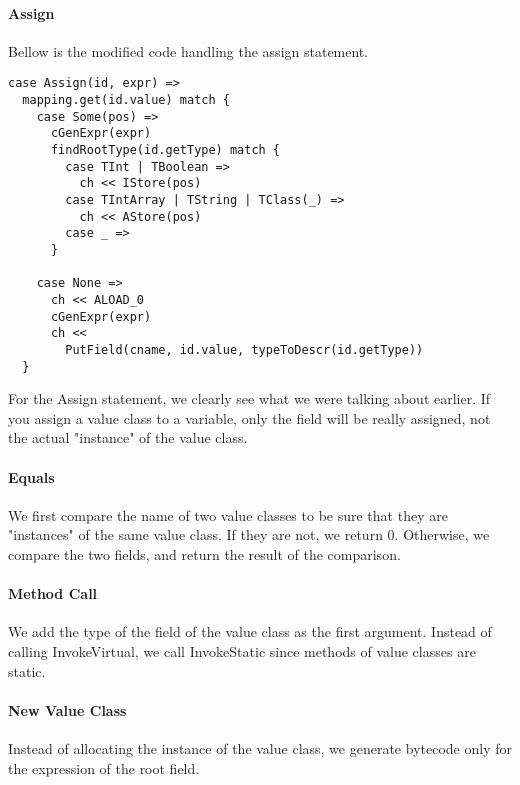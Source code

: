 \paragraph{Assign}
Bellow is the modified code handling the assign statement.
\begin{verbatim}
case Assign(id, expr) =>
  mapping.get(id.value) match {
    case Some(pos) =>
      cGenExpr(expr)
      findRootType(id.getType) match {
        case TInt | TBoolean => 
          ch << IStore(pos)
        case TIntArray | TString | TClass(_) => 
          ch << AStore(pos)
        case _ =>
      }

    case None =>
      ch << ALOAD_0
      cGenExpr(expr)
      ch << 
        PutField(cname, id.value, typeToDescr(id.getType))
  }
\end{verbatim}
For the Assign statement, we clearly see what we were talking about earlier. 
If you assign a value class to a variable, only the field will be really assigned, not the actual "instance" of the value class.

\paragraph{Equals}
We first compare the name of two value classes to be sure that they are "instances" of the same value class. If they are not, we return 0. Otherwise, we compare the two fields, and return the result of the comparison.

\paragraph{Method Call}
We add the type of the field of the value class as the first argument.
Instead of calling InvokeVirtual, we call InvokeStatic since methods of value classes are static.

\paragraph{New Value Class}
Instead of allocating the instance of the value class, we generate bytecode only for the expression of the root field.
\newpage